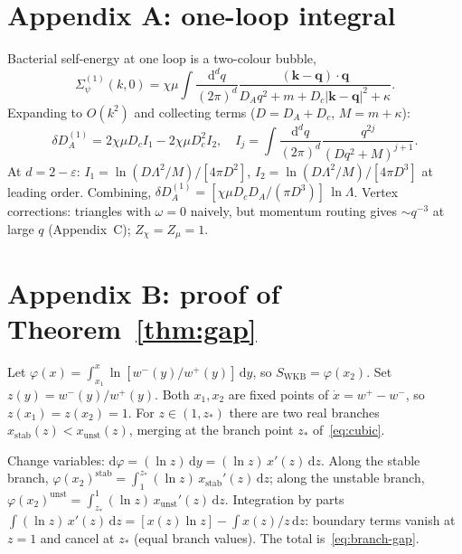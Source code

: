 \documentclass[11pt,a4paper]{article}
\newcommand{\dd}{\mathrm{d}}
\theoremstyle{plain}
\begin{document}
\appendix

\section*{Appendix A: one-loop integral}

Bacterial self-energy at one loop is a two-colour bubble,
\begin{equation}
  \Sigma_\psi^{(1)}(k,0)
  = \chi\mu\!\int\!\frac{\dd^d q}{(2\pi)^d}
  \frac{(\mathbf{k}-\mathbf{q})\cdot\mathbf{q}}
  {D_A q^2 + m + D_c|\mathbf{k}-\mathbf{q}|^2 + \kappa}.
\end{equation}
Expanding to $O(k^2)$ and collecting terms
($D = D_A + D_c$, $M = m + \kappa$):
\begin{equation}
  \delta D_A^{(1)} = 2\chi\mu D_c I_1 - 2\chi\mu D_c^2 I_2,
  \quad
  I_j = \int\!\frac{\dd^d q}{(2\pi)^d}
    \frac{q^{2j}}{(Dq^2+M)^{j+1}}.
\end{equation}
At $d = 2-\varepsilon$: $I_1 = \ln(D\Lambda^2/M)/[4\pi D^2]$,
$I_2 = \ln(D\Lambda^2/M)/[4\pi D^3]$ at leading order.  Combining,
$\delta D_A^{(1)} = [\chi\mu D_c D_A/(\pi D^3)]\,\ln\Lambda$.
Vertex corrections: triangles with $\omega = 0$ naively, but
momentum routing gives $\sim q^{-3}$ at large $q$
(Appendix~C); $Z_\chi = Z_\mu = 1$.

\section*{Appendix B: proof of Theorem~\ref{thm:gap}}

Let $\varphi(x) = \int_{x_1}^x \ln[w^-(y)/w^+(y)]\,\dd y$,
so $S_{\mathrm{WKB}} = \varphi(x_2)$.  Set $z(y) = w^-(y)/w^+(y)$.
Both $x_1, x_2$ are fixed points of $\dot x = w^+ - w^-$, so
$z(x_1) = z(x_2) = 1$.  For $z \in (1, z_*)$ there are two real
branches $x_{\mathrm{stab}}(z) < x_{\mathrm{unst}}(z)$, merging at
the branch point $z_*$ of~\eqref{eq:cubic}.

Change variables: $\dd\varphi = (\ln z)\,\dd y
= (\ln z)\,x'(z)\,\dd z$.  Along the stable branch,
$\varphi(x_2)^{\mathrm{stab}} = \int_1^{z_*}(\ln z)\,x_{\mathrm{stab}}'(z)\,\dd z$;
along the unstable branch, $\varphi(x_2)^{\mathrm{unst}} =
\int_{z_*}^1(\ln z)\,x_{\mathrm{unst}}'(z)\,\dd z$.  Integration
by parts $\int (\ln z)\,x'(z)\,\dd z = [x(z)\ln z] - \int
x(z)/z\,\dd z$: boundary terms vanish at $z=1$ and cancel at
$z_*$ (equal branch values).  The total is~\eqref{eq:branch-gap}.
\end{document}
